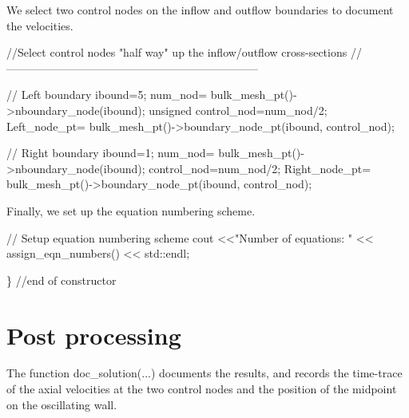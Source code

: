 We select two control nodes on the inflow and outflow boundaries to document the velocities.


\begin{DoxyCodeInclude}



  \textcolor{comment}{//Select control nodes "half way" up the inflow/outflow cross-sections}
  \textcolor{comment}{//--------------------------------------------------------------------}
  
  \textcolor{comment}{// Left boundary}
  ibound=5; 
  num\_nod= bulk\_mesh\_pt()->nboundary\_node(ibound);
  \textcolor{keywordtype}{unsigned} control\_nod=num\_nod/2;
  Left\_node\_pt= bulk\_mesh\_pt()->boundary\_node\_pt(ibound, control\_nod);
  
  \textcolor{comment}{// Right boundary}
  ibound=1; 
  num\_nod= bulk\_mesh\_pt()->nboundary\_node(ibound);
  control\_nod=num\_nod/2;
  Right\_node\_pt= bulk\_mesh\_pt()->boundary\_node\_pt(ibound, control\_nod);

\end{DoxyCodeInclude}


Finally, we set up the equation numbering scheme.


\begin{DoxyCodeInclude}
  
  \textcolor{comment}{// Setup equation numbering scheme}
  cout <<\textcolor{stringliteral}{"Number of equations: "} << assign\_eqn\_numbers() << std::endl; 
  
\} \textcolor{comment}{//end of constructor}

\end{DoxyCodeInclude}




 

\hypertarget{index_doc}{}\section{Post processing}\label{index_doc}
The function {\ttfamily doc\+\_\+solution}(...) documents the results, and records the time-\/trace of the axial velocities at the two control nodes and the position of the midpoint on the oscillating wall.

